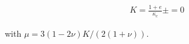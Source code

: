 \begin{eqnarray}
K=\frac{1+e}{\kappa_c}\pm=0
\label{eqn:cc_K}
\end{eqnarray}

with $\mu=3(1-2\nu)K/(2(1+\nu))$.






